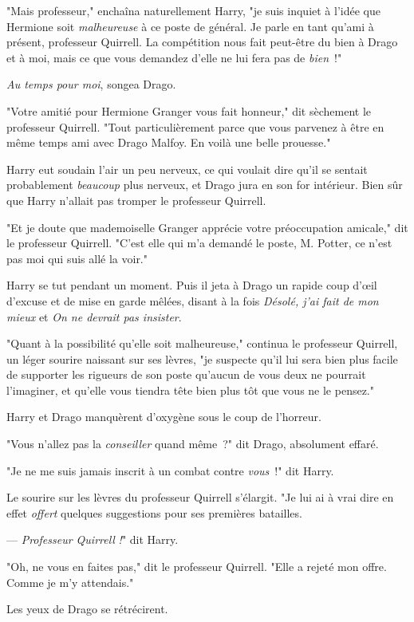 "Mais professeur," enchaîna naturellement Harry, "je suis inquiet à l'idée que Hermione soit \emph{malheureuse} à ce poste de général. Je parle en tant qu'ami à présent, professeur Quirrell. La compétition nous fait peut-être du bien à Drago et à moi, mais ce que vous demandez d'elle ne lui fera pas de \emph{bien}~!"

\emph{Au temps pour moi}, songea Drago.

"Votre amitié pour Hermione Granger vous fait honneur," dit sèchement le professeur Quirrell. "Tout particulièrement parce que vous parvenez à être en même temps ami avec Drago Malfoy. En voilà une belle prouesse."

Harry eut soudain l'air un peu nerveux, ce qui voulait dire qu'il se sentait probablement \emph{beaucoup} plus nerveux, et Drago jura en son for intérieur. Bien sûr que Harry n'allait pas tromper le professeur Quirrell.

"Et je doute que mademoiselle Granger apprécie votre préoccupation amicale," dit le professeur Quirrell. "C'est elle qui m'a demandé le poste, M. Potter, ce n'est pas moi qui suis allé la voir."

Harry se tut pendant un moment. Puis il jeta à Drago un rapide coup d'œil d'excuse et de mise en garde mêlées, disant à la fois \emph{Désolé, j'ai fait de mon mieux} et \emph{On ne devrait pas insister}.

"Quant à la possibilité qu'elle soit malheureuse," continua le professeur Quirrell, un léger sourire naissant sur ses lèvres, "je suspecte qu'il lui sera bien plus facile de supporter les rigueurs de son poste qu'aucun de vous deux ne pourrait l'imaginer, et qu'elle vous tiendra tête bien plus tôt que vous ne le pensez."

Harry et Drago manquèrent d'oxygène sous le coup de l'horreur.

"Vous n'allez pas la \emph{conseiller} quand même~?" dit Drago, absolument effaré.

"Je ne me suis jamais inscrit à un combat contre \emph{vous}~!" dit Harry.

Le sourire sur les lèvres du professeur Quirrell s'élargit. "Je lui ai à vrai dire en effet \emph{offert} quelques suggestions pour ses premières batailles.

--- \emph{Professeur Quirrell} \emph{!}" dit Harry.

"Oh, ne vous en faites pas," dit le professeur Quirrell. "Elle a rejeté mon offre. Comme je m'y attendais."

Les yeux de Drago se rétrécirent.

